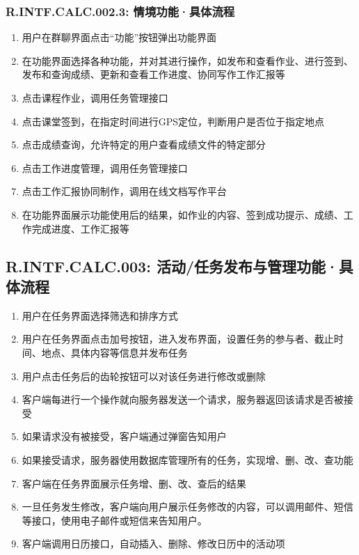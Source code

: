        \subsubsection{R.INTF.CALC.002.3: 情境功能·具体流程}
        \begin{enumerate}
            \item 用户在群聊界面点击“功能”按钮弹出功能界面
            \item 在功能界面选择各种功能，并对其进行操作，如发布和查看作业、进行签到、发布和查询成绩、更新和查看工作进度、协同写作工作汇报等
            \item 点击课程作业，调用任务管理接口
            \item 点击课堂签到，在指定时间进行GPS定位，判断用户是否位于指定地点
            \item 点击成绩查询，允许特定的用户查看成绩文件的特定部分
            \item 点击工作进度管理，调用任务管理接口
            \item 点击工作汇报协同制作，调用在线文档写作平台
            \item 在功能界面展示功能使用后的结果，如作业的内容、签到成功提示、成绩、工作完成进度、工作汇报等
        \end{enumerate}
    \subsection{R.INTF.CALC.003: 活动/任务发布与管理功能·具体流程}
    \begin{enumerate}
        \item 用户在任务界面选择筛选和排序方式
        \item 用户在任务界面点击加号按钮，进入发布界面，设置任务的参与者、截止时间、地点、具体内容等信息并发布任务
        \item 用户点击任务后的齿轮按钮可以对该任务进行修改或删除
        \item 客户端每进行一个操作就向服务器发送一个请求，服务器返回该请求是否被接受
        \item 如果请求没有被接受，客户端通过弹窗告知用户
        \item 如果接受请求，服务器使用数据库管理所有的任务，实现增、删、改、查功能
        \item 客户端在任务界面展示任务增、删、改、查后的结果
        \item 一旦任务发生修改，客户端向用户展示任务修改的内容，可以调用邮件、短信等接口，使用电子邮件或短信来告知用户。
        \item 客户端调用日历接口，自动插入、删除、修改日历中的活动项
    \end{enumerate}
